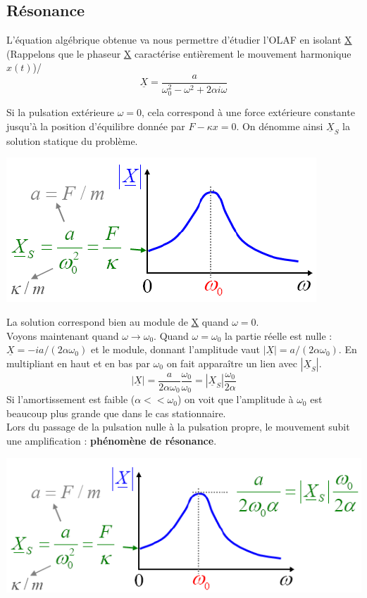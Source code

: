 \documentclass	[11pt, a4paper, openany]{book}
\begin{document}
	\subsection{Résonance}
	L'équation algébrique obtenue va nous permettre d'étudier l'OLAF en isolant \underline{X} (Rappelons que le phaseur \underline{X} caractérise entièrement le mouvement harmonique $x(t)$)/
	\begin{equation}
		\underline{X} = \frac{a}{\omega_0^2 - \omega^2 + 2\alpha i\omega}
	\end{equation}
	
	Si la pulsation extérieure $\omega = 0$, cela correspond à une force extérieure constante jusqu'à la position d'équilibre donnée par $F - \kappa x = 0$. On dénomme ainsi $\underline{X}_S$ la solution statique  du problème.
	\begin{center}
		\includegraphics[scale=0.65]{oo/image15.png}
	\end{center}
	La solution correspond bien au module de \underline{X} quand $\omega = 0$.\\
	
	Voyons maintenant quand $\omega \rightarrow \omega_0$. Quand $\omega = \omega_0$ la partie réelle est nulle : $\underline{X} = -ia/(2\alpha\omega_0)$ et le module, donnant l'amplitude vaut $|\underline{X}| = a/(2\alpha\omega_0)$. En multipliant en haut et en bas par $\omega_0$ on fait apparaître un lien avec $|\underline{X}_S|$.
	\begin{equation}
		|\underline{X}| = \frac{a}{2\alpha\omega_0}\frac{\omega_0}{\omega_0} = |\underline{X}_S|\frac{\omega_0}{2\alpha}
	\end{equation}
	Si l'amortissement est faible ($\alpha << \omega_0$) on voit que l'amplitude à $\omega_0$ est beaucoup plus grande que dans le cas stationnaire.\\
	Lors du passage de la pulsation nulle à la pulsation propre, le mouvement subit une amplification : \textbf{phénomène de résonance}.
	\begin{center}
		\includegraphics[scale=0.65]{oo/image16.png}
	\end{center}
\end{document}
